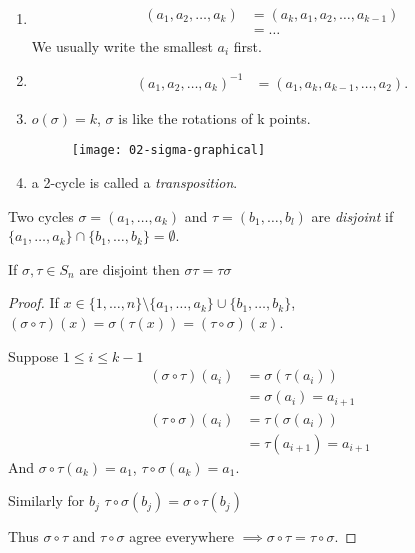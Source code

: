 \begin{remark} ~
\begin{enumerate}
\def\labelenumi{\roman{enumi}.}
\item
  \begin{align*}
   (a_1, a_2, \dots, a_k) &= (a_k, a_1, a_2, \dots, a_{k-1}) \\
   &= \dots
  \end{align*} We usually write the smallest $a_i$ first.
\item
  \begin{align*}
  (a_1, a_2, \dots, a_k)^{-1} &= (a_1, a_k, a_{k-1}, \dots, a_2).
  \end{align*}
\item
  $o(\sigma) = k$, $\sigma$ is like the rotations of k points.
  \begin{figure}
    \centering \texttt{[image: 02-sigma-graphical]}
  \end{figure} 
\item
  a 2-cycle is called a \emph{transposition}.
\end{enumerate}

\end{remark}

\begin{definition}
Two cycles $\sigma = (a_1, \dots, a_k)$ and $\tau = (b_1, \dots, b_l)$ are \emph{disjoint} if $\{ a_1, \dots, a_k \} \cap \{ b_1, \dots, b_k \} = \emptyset$.
\end{definition}

\begin{lemma}
\protect\hypertarget{lem:six}{}\label{lem:six}
If $\sigma, \tau \in S_n$ are disjoint then $\sigma \tau = \tau \sigma$
\end{lemma}

\begin{proof}
If $x \in \{1, \dots, n\} \setminus \{ a_1, \dots, a_k \} \cup \{ b_1, \dots, b_k \}$, $(\sigma \circ \tau) (x) = \sigma \left( \tau(x) \right) = (\tau \circ \sigma)(x)$.

Suppose $1 \leq i \leq k - 1$
\begin{align*}
    (\sigma \circ \tau)(a_i) &= \sigma\left(\tau(a_i) \right) \\
    &= \sigma(a_i) = a_{i + 1} \\
    (\tau \circ \sigma)(a_i) &= \tau\left(\sigma(a_i) \right) \\
    &= \tau(a_{i + 1}) = a_{i + 1}
\end{align*}
And $\sigma \circ \tau (a_k) = a_1$, $\tau \circ \sigma (a_k) = a_1$.

Similarly for $b_j$
$\tau \circ \sigma (b_j) = \sigma \circ \tau (b_j)$

Thus $\sigma \circ \tau$ and $\tau \circ \sigma$ agree everywhere $\implies \sigma \circ \tau = \tau \circ \sigma$.
\end{proof}

